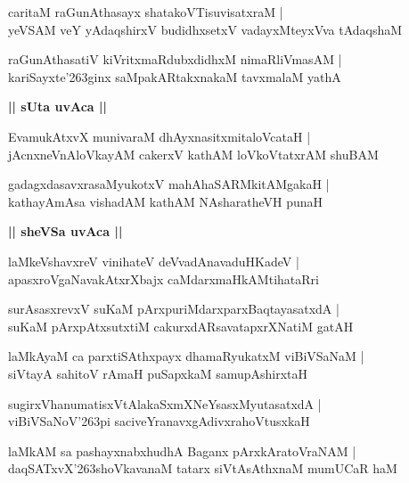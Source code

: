 \documentclass[twoside,12pt,openright]{book}
\def\S{\char'263}
\newcounter{shloka}[chapter]
\def\uvaca#1{\centerline{{\large\textbf{#1}}}}
\begin{document}
\begin{shloka}%
caritaM raGunAthasayx shatakoVTisuvisatxraM |\\
yeVSAM veY yAdaqshirxV budidhxsetxV vadayxMteyxVva tAdaqshaM 
\end{shloka}

\begin{shloka}%
raGunAthasatiV kiVritxmaRdubxdidhxM nimaRliVmasAM |\\
kariSayxte\S ginx saMpakARtakxnakaM tavxmalaM yathA 
\end{shloka}

\uvaca{|| sUta uvAca ||}

\begin{shloka}%
EvamukAtxvX munivaraM dhAyxnasitxmitaloVcataH |\\
jAcnxneVnAloVkayAM cakerxV kathAM loVkoVtatxrAM shuBAM 
\end{shloka}

\begin{shloka}%
gadagxdasavxrasaMyukotxV mahAhaSARMkitAMgakaH |\\
kathayAmAsa vishadAM kathAM NAsharatheVH punaH 
\end{shloka}

\uvaca{|| sheVSa uvAca ||}

\begin{shloka}%
laMkeVshavxreV vinihateV deVvadAnavaduHKadeV |\\
apasxroVgaNavakAtxrXbajx caMdarxmaHkAMtihataRri
\end{shloka}

\begin{shloka}%
surAsasxrevxV suKaM pArxpuriMdarxparxBaqtayasatxdA |\\
suKaM pArxpAtxsutxtiM cakurxdARsavatapxrXNatiM gatAH 
\end{shloka}

\begin{shloka}%
laMkAyaM ca parxtiSAthxpayx dhamaRyukatxM viBiVSaNaM |\\
siVtayA sahitoV rAmaH puSapxkaM samupAshirxtaH 
\end{shloka}

\begin{shloka}%
sugirxVhanumatisxVtAlakaSxmXNeYsasxMyutasatxdA |\\
viBiVSaNoV\S pi saciveYranavxgAdivxrahoVtusxkaH
\end{shloka}

\begin{shloka}%
laMkAM sa pashayxnabxhudhA Baganx pArxkAratoVraNAM |\\
daqSATxvX\S shoVkavanaM tatarx siVtAsAthxnaM mumUCaR haM 
\end{shloka}
\end{document}
